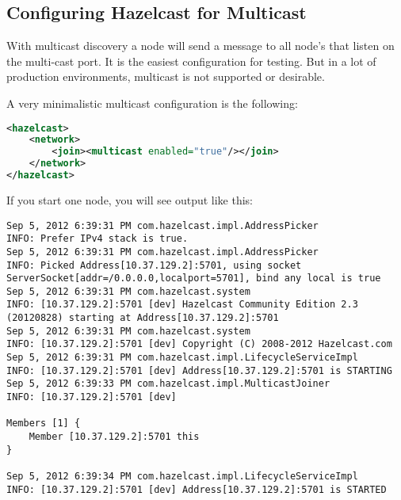 \subsection{Configuring Hazelcast for Multicast}
With multicast discovery a node will send a message to all node's that listen on the multi-cast port. It is the easiest configuration for testing. But in a lot of production environments, multicast is not supported or desirable.

A very minimalistic multicast configuration is the following:
\begin{lstlisting}[language=xml]
<hazelcast>
    <network>
        <join><multicast enabled="true"/></join>
    </network>
</hazelcast>
\end{lstlisting}

If you start one node, you will see output like this:
\begin{lstlisting}
Sep 5, 2012 6:39:31 PM com.hazelcast.impl.AddressPicker
INFO: Prefer IPv4 stack is true.
Sep 5, 2012 6:39:31 PM com.hazelcast.impl.AddressPicker
INFO: Picked Address[10.37.129.2]:5701, using socket ServerSocket[addr=/0.0.0.0,localport=5701], bind any local is true
Sep 5, 2012 6:39:31 PM com.hazelcast.system
INFO: [10.37.129.2]:5701 [dev] Hazelcast Community Edition 2.3 (20120828) starting at Address[10.37.129.2]:5701
Sep 5, 2012 6:39:31 PM com.hazelcast.system
INFO: [10.37.129.2]:5701 [dev] Copyright (C) 2008-2012 Hazelcast.com
Sep 5, 2012 6:39:31 PM com.hazelcast.impl.LifecycleServiceImpl
INFO: [10.37.129.2]:5701 [dev] Address[10.37.129.2]:5701 is STARTING
Sep 5, 2012 6:39:33 PM com.hazelcast.impl.MulticastJoiner
INFO: [10.37.129.2]:5701 [dev] 

Members [1] {
    Member [10.37.129.2]:5701 this
}

Sep 5, 2012 6:39:34 PM com.hazelcast.impl.LifecycleServiceImpl
INFO: [10.37.129.2]:5701 [dev] Address[10.37.129.2]:5701 is STARTED
\end{lstlisting}	

